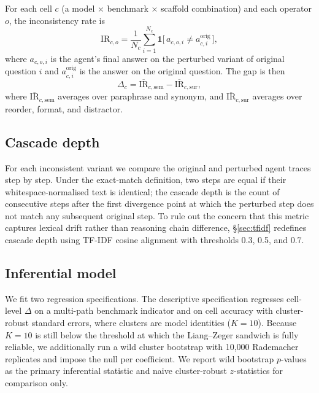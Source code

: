 \documentclass[11pt]{article}
\begin{document}
For each cell $c$ (a model $\times$ benchmark $\times$ scaffold combination) and each operator $o$, the inconsistency rate is
\begin{equation}
\mathrm{IR}_{c,o} = \frac{1}{N_c}\sum_{i=1}^{N_c}\mathbf{1}\bigl[\,a_{c,o,i}\ne a^{\mathrm{orig}}_{c,i}\,\bigr],
\end{equation}
where $a_{c,o,i}$ is the agent's final answer on the perturbed variant of original question $i$ and $a^{\mathrm{orig}}_{c,i}$ is the answer on the original question. The gap is then
\begin{equation}
\Delta_c = \overline{\mathrm{IR}}_{c,\mathrm{sem}} - \overline{\mathrm{IR}}_{c,\mathrm{sur}},
\end{equation}
where $\overline{\mathrm{IR}}_{c,\mathrm{sem}}$ averages over paraphrase and synonym, and $\overline{\mathrm{IR}}_{c,\mathrm{sur}}$ averages over reorder, format, and distractor.

\subsection{Cascade depth}
\label{sec:cascade}

For each inconsistent variant we compare the original and perturbed agent traces step by step. Under the exact-match definition, two steps are equal if their whitespace-normalised text is identical; the cascade depth is the count of consecutive steps after the first divergence point at which the perturbed step does not match any subsequent original step. To rule out the concern that this metric captures lexical drift rather than reasoning chain difference, \S\ref{sec:tfidf} redefines cascade depth using TF-IDF cosine alignment with thresholds 0.3, 0.5, and 0.7.

\subsection{Inferential model}

We fit two regression specifications. The descriptive specification regresses cell-level $\Delta$ on a multi-path benchmark indicator and on cell accuracy with cluster-robust standard errors, where clusters are model identities ($K{=}10$). Because $K{=}10$ is still below the threshold at which the Liang--Zeger sandwich is fully reliable, we additionally run a wild cluster bootstrap with 10{,}000 Rademacher replicates and impose the null per coefficient. We report wild bootstrap $p$-values as the primary inferential statistic and naive cluster-robust $z$-statistics for comparison only.
\end{document}
